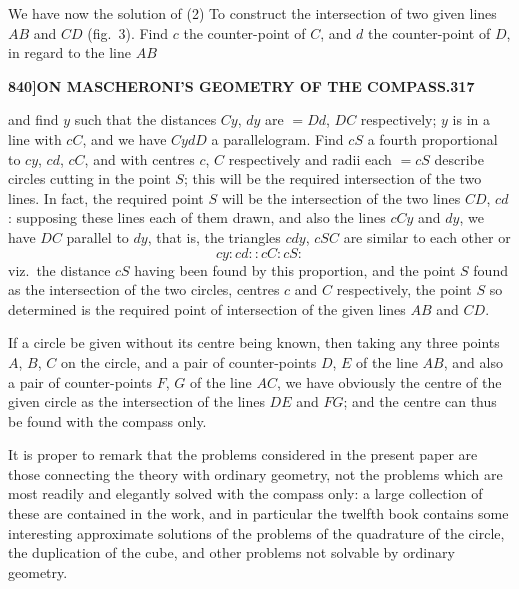 \documentclass[11pt,a4paper]{book}
\begin{document}
We have now the solution of (2) To construct the intersection of two given lines $AB$ and $CD$ (fig.\ 3). Find $c$ the counter-point of $C$, and $d$ the counter-point of $D$, in regard to the line $AB$

\begin{figure}[H]
\centering
{}
\end{figure}

\newpage
\setcounter{page}{317}

\noindent\textbf{840]}\hfill\textbf{ON MASCHERONI'S GEOMETRY OF THE COMPASS.}\hfill\textbf{317}

\bigskip

\noindent and find $y$ such that the distances $Cy$, $dy$ are $= Dd$, $DC$ respectively; $y$ is in a line with $cC$, and we have $CydD$ a parallelogram. Find $cS$ a fourth proportional to $cy$, $cd$, $cC$, and with centres $c$, $C$ respectively and radii each $= cS$ describe circles cutting in the point $S$; this will be the required intersection of the two lines. In fact, the required point $S$ will be the intersection of the two lines $CD$, $cd$: supposing these lines each of them drawn, and also the lines $cCy$ and $dy$, we have $DC$ parallel to $dy$, that is, the triangles $cdy$, $cSC$ are similar to each other or
\[
cy : cd :: cC : cS:
\]
viz.\ the distance $cS$ having been found by this proportion, and the point $S$ found as the intersection of the two circles, centres $c$ and $C$ respectively, the point $S$ so determined is the required point of intersection of the given lines $AB$ and $CD$.

If a circle be given without its centre being known, then taking any three points $A$, $B$, $C$ on the circle, and a pair of counter-points $D$, $E$ of the line $AB$, and also a pair of counter-points $F$, $G$ of the line $AC$, we have obviously the centre of the given circle as the intersection of the lines $DE$ and $FG$; and the centre can thus be found with the compass only.

It is proper to remark that the problems considered in the present paper are those connecting the theory with ordinary geometry, not the problems which are most readily and elegantly solved with the compass only: a large collection of these are contained in the work, and in particular the twelfth book contains some interesting approximate solutions of the problems of the quadrature of the circle, the duplication of the cube, and other problems not solvable by ordinary geometry.
\end{document}
